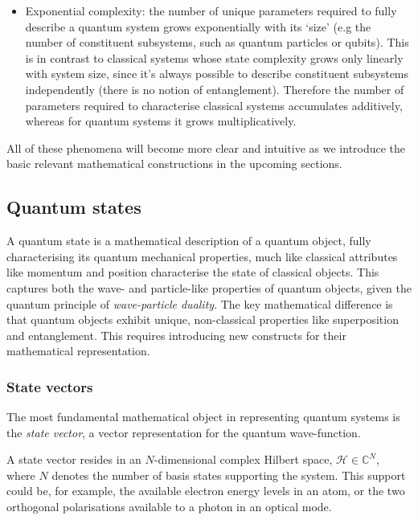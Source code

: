 \begin{itemize}
	\item Exponential complexity: the number of unique parameters required to fully describe a quantum system grows exponentially with its `size' (e.g the number of constituent subsystems, such as quantum particles or qubits). This is in contrast to classical systems whose state complexity grows only linearly with system size, since it's always possible to describe constituent subsystems independently (there is no notion of entanglement). Therefore the number of parameters required to characterise classical systems accumulates additively, whereas for quantum systems it grows multiplicatively.
\end{itemize}

All of these phenomena will become more clear and intuitive as we introduce the basic relevant mathematical constructions in the upcoming sections.

%
%

\subsection{Quantum states}

A quantum state is a mathematical description of a quantum object, fully characterising its quantum mechanical properties, much like classical attributes like momentum and position characterise the state of classical objects. This captures both the wave- and particle-like properties of quantum objects, given the quantum principle of \textit{wave-particle duality}. The key mathematical difference is that quantum objects exhibit unique, non-classical properties like superposition and entanglement. This requires introducing new constructs for their mathematical representation.

%
%

\subsubsection{State vectors}

The most fundamental mathematical object in representing quantum systems is the \textit{state vector}, a vector representation for the quantum wave-function.

A state vector resides in an $N$-dimensional complex Hilbert space, \mbox{$\mathcal{H}\in\mathbb{C}^N$}, where $N$ denotes the number of basis states supporting the system. This support could be, for example, the available electron energy levels in an atom, or the two orthogonal polarisations available to a photon in an optical mode.

